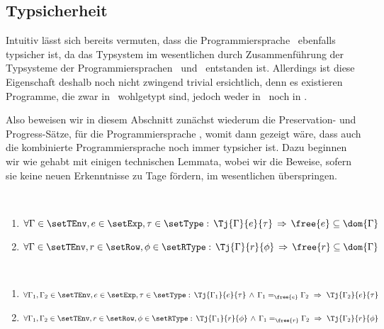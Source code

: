 
\subsection{Typsicherheit}

Intuitiv l\"asst sich bereits vermuten, dass die Programmiersprache \Losrt\ ebenfalls typsicher ist,
da das Typsystem im wesentlichen durch Zusammenf\"uhrung der Typsysteme der Programmiersprachen
\Losub\ und \Lort\ entstanden ist. Allerdings ist diese Eigenschaft deshalb noch nicht zwingend
trivial ersichtlich, denn es existieren Programme, die zwar in \Losrt\ wohlgetypt sind, jedoch
weder in \Losub\ noch in \Lort.

Also beweisen wir in diesem Abschnitt zun\"achst wiederum die Preservation- und Progress-S\"atze,
f\"ur die Programmiersprache \Losrt, womit dann gezeigt w\"are, dass auch die kombinierte Programmiersprache
noch immer typsicher ist. Dazu beginnen wir wie gehabt mit einigen technischen Lemmata, wobei wir die
Beweise, sofern sie keine neuen Erkenntnisse zu Tage f\"ordern, im wesentlichen \"uberspringen.

\begin{lemma} \label{lemma:Losrt:free_und_dom_Gamma} \
  \begin{enumerate}
    \item $\forall \Gamma \in \setTEnv, e\in\setExp,\tau\in\setType:\,
           \Tj{\Gamma}{e}{\tau}\,\Rightarrow\,\free{e}\subseteq\dom{\Gamma}$
    \item $\forall \Gamma \in \setTEnv, r\in\setRow,\phi\in\setRType:\,
           \Tj{\Gamma}{r}{\phi}\,\Rightarrow\,\free{r}\subseteq\dom{\Gamma}$
  \end{enumerate}
\end{lemma}


\begin{lemma} \label{lemma:Losrt:Koinzidenzlemma} \
  \begin{enumerate}
    \item $\forall \Gamma_1,\Gamma_2 \in \setTEnv, e \in \setExp, \tau \in \setType:\,
           \Tj{\Gamma_1}{e}{\tau}\,\wedge\,\Gamma_1 =_{\free{e}} \Gamma_2
           \ \Rightarrow \ 
           \Tj{\Gamma_2}{e}{\tau}$
    \item $\forall \Gamma_1,\Gamma_2 \in \setTEnv, r \in \setRow, \phi \in \setRType:\,
           \Tj{\Gamma_1}{r}{\phi}\,\wedge\,\Gamma_1 =_{\free{r}} \Gamma_2
           \ \Rightarrow \ 
           \Tj{\Gamma_2}{r}{\phi}$
  \end{enumerate}
\end{lemma}

